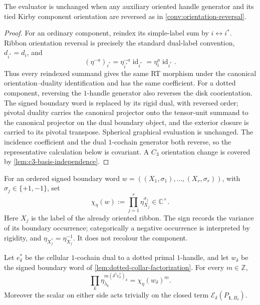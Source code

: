\begin{proposition}
\label{prop:orientation-choice-independence}
The evaluator is unchanged when any auxiliary oriented handle generator and
its tied Kirby component orientation are reversed as in
\cref{conv:orientation-reversal}.
\end{proposition}

\begin{proof}
For an ordinary component, reindex its simple-label sum by
$i\leftrightarrow i^*$.  Ribbon orientation reversal is precisely the
standard dual-label convention, $d_{i^*}=d_i$, and
\[
  (\eta^{-a})_{i^*}
  =\eta_{i^*}^{-a}\operatorname{id}_{i^*}
  =\eta_i^a\operatorname{id}_{i^*}.
\]
Thus every reindexed summand gives the same RT morphism under the canonical
orientation--duality identification and has the same coefficient.  For a
dotted component, reversing the $1$-handle generator also reverses the disk
coorientation.  The signed boundary word is replaced by its rigid dual, with
reversed order; pivotal duality carries the canonical projector onto the
tensor-unit summand to the canonical projector on the dual boundary object,
and the exterior closure is carried to its pivotal transpose.  Spherical
graphical evaluation is unchanged.  The incidence
coefficient and the dual $1$-cochain generator both reverse, so the
representative calculation below is covariant.  A $C_3$ orientation change
is covered by \cref{lem:c3-basis-independence}.
\end{proof}

For an ordered signed boundary word
$w=((X_1,\sigma_1),\ldots,(X_r,\sigma_r))$, with
$\sigma_j\in\{+1,-1\}$, set
\[
  \chi_\eta(w):=\prod_{j=1}^r\eta_{X_j}^{\sigma_j}
  \in\mathbb C^\times.
\]
Here $X_j$ is the label of the already oriented ribbon.  The sign records the
variance of its boundary occurrence; categorically a negative occurrence is
interpreted by rigidity, and
$\eta_{X_j^*}=\eta_{X_j}^{-1}$.  It does not recolour the component.

\begin{lemma}
\label{lem:dotted-incidence-character}
Let $e_\delta^*$ be the cellular $1$-cochain dual to a dotted primal
$1$-handle, and let $w_\delta$ be the signed boundary word of
\cref{lem:dotted-collar-factorization}.  For every $m\in\mathbb Z$,
\[
  \prod_k\eta_{\lambda_k}^{m(\delta^1e_\delta^*)_k}
  =
  \chi_\eta(w_\delta)^m.
  \tag{3.3}\label{eq:dotted-incidence-character}
\]
Moreover the scalar on either side acts trivially on the closed term
$\mathcal E_\delta(P_{\mathbf1,B_\delta})$.
\end{lemma}

